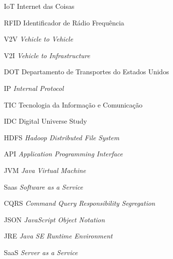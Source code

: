 \begin{siglas}
  \item[IoT] Internet das Coisas
  \item[RFID] Identificador de Rádio Frequência
  \item[V2V] \textit{Vehicle to Vehicle}
  \item[V2I] \textit{Vehicle to Infrastructure}
  \item[DOT] Departamento de Transportes do Estados Unidos
  \item[IP]  \textit{Internal Protocol}
  \item[TIC] Tecnologia da Informação e Comunicação
  \item[IDC] Digital Universe Study
  \item[HDFS] \textit{Hadoop Distributed File System}
  \item[API] \textit{Application Programming Interface}
  \item[JVM] \textit{Java Virtual Machine}
  \item[Saas] \textit{Software as a Service}
  \item[CQRS] \textit{Command Query Responsibility Segregation}
  \item[JSON] \textit{JavaScript Object Notation}
  \item[JRE] \textit{Java SE Runtime Environment}
  \item[SaaS] \textit{Server as a Service}
\end{siglas}